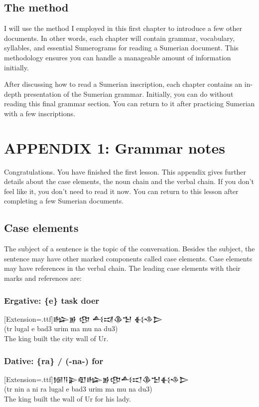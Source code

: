\documentclass[a4paper,12pt]{book}
\newcommand{\fcn}{\setmainfont{Akkadian}[Extension=.ttf]}
\newcommand{\fsm}{\Large\setmainfont{Akkadian}[Extension=.ttf]}
\begin{document}
\section{The method}
I will use the method I employed in this first
chapter to introduce a few other documents.
In other words, each chapter will contain
grammar, vocabulary, syllables,
and essential Sumerograms for reading
a Sumerian document. This methodology ensures
you can handle a manageable amount of information
initially.

After discussing how to read a Sumerian inscription,
each chapter contains an in-depth presentation
of the Sumerian grammar. Initially,
you can do without reading this final
grammar section. You can return
to it after practicing Sumerian with a few inscriptions.

\chapter*{APPENDIX 1: Grammar notes}

Congratulations. You have finished the first lesson.
This appendix gives further details about the
case elements, the noun chain and the verbal chain.
If you don't feel like it, you don't need to read
it now. You can return to this lesson after completing
a few Sumerian documents.

\section*{Case elements}
The subject of a sentence is the topic of the conversation.
Besides the subject, the sentence may have other marked
components called case elements. Case elements may have
references in the verbal chain. The leading case elements
with their marks and references are:

\subsection*{Ergative:  \{e\} task doer}
{\fsm 𒈗𒂊  𒂦 𒋀𒀕𒆠𒈠  𒈬𒈾𒆕}\\
(tr lugal e bad3 urim ma mu na du3)\\
The king built the city wall of Ur.
\index{e {\fcn 𒂊} ! ergative mark}

\subsection*{Dative: \{ra\} / (-na-) for}
{\fcn\Large 𒎏𒀀𒉌𒊏𒈗𒂊𒂦𒋀𒀊𒆠𒈠𒈬𒈾𒆕}\\
(tr nin a ni ra lugal e bad3 urim ma mu na du3)\\
The king built the wall of Ur for his lady.
\index{ra {\fcn 𒊏} ! dative mark}
\end{document}
